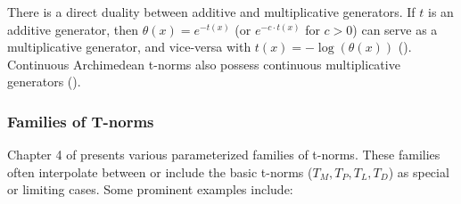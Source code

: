 \begin{remark}
  There is a direct duality between additive and multiplicative generators. If $t$ is an additive generator, then $\theta(x) = e^{-t(x)}$ (or $e^{-c \cdot t(x)}$ for $c>0$) can serve as a multiplicative generator, and vice-versa with $t(x) = -\log(\theta(x))$ (\cite[Remark 3.34, p.~90]{Klement2000}). Continuous Archimedean t-norms also possess continuous multiplicative generators (\cite[Corollary 5.4, p.~124]{Klement2000}).
\end{remark}

\subsubsection{Families of T-norms}

Chapter 4 of \cite{Klement2000} presents various parameterized families of t-norms. These families often interpolate between or include the basic t-norms ($T_M, T_P, T_L, T_D$) as special or limiting cases. Some prominent examples include:

